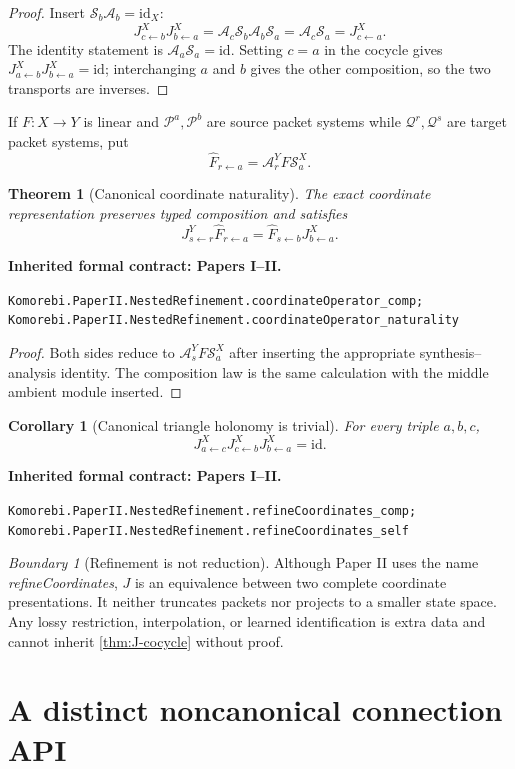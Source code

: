 \documentclass[11pt,a4paper]{article}
\newtheorem{theorem}{Theorem}[section]
\theoremstyle{plain}
\newtheorem{corollary}[corollary]{Corollary}
\theoremstyle{definition}
\theoremstyle{remark}
\newtheorem{boundary}[boundary]{Boundary}
\newcommand{\cA}{\mathcal A}
\newcommand{\cP}{\mathcal P}
\newcommand{\cQ}{\mathcal Q}
\newcommand{\cS}{\mathcal S}
\newcommand{\id}{\mathrm{id}}
\newcommand{\leanname}[1]{\nolinkurl{#1}}
\newcommand{\statusleanprior}[1]{\par\smallskip\noindent\begin{minipage}{\linewidth}{\color{leanblue}\textbf{Inherited formal contract: Papers I--II.}}\par\begingroup\small\raggedright\leanname{#1}\par\endgroup\end{minipage}\par\smallskip}
\begin{document}
\begin{proof}
Insert $\cS_b\cA_b=\id_X$:
\[
J^X_{c\leftarrow b}J^X_{b\leftarrow a}
=\cA_c\cS_b\cA_b\cS_a
=\cA_c\cS_a
=J^X_{c\leftarrow a}.
\]
The identity statement is $\cA_a\cS_a=\id$.  Setting $c=a$ in the cocycle
gives $J^X_{a\leftarrow b}J^X_{b\leftarrow a}=\id$; interchanging $a$ and $b$
gives the other composition, so the two transports are inverses.
\end{proof}

If $F:X\to Y$ is linear and $\cP^a,\cP^b$ are source packet systems while
$\cQ^r,\cQ^s$ are target packet systems, put
\[
\widehat F_{r\leftarrow a}
=
\cA^Y_rF\cS^X_a.
\]

\begin{theorem}[Canonical coordinate naturality]
\label{thm:canonical-naturality}
The exact coordinate representation preserves typed composition and satisfies
\[
J^Y_{s\leftarrow r}\widehat F_{r\leftarrow a}
=
\widehat F_{s\leftarrow b}J^X_{b\leftarrow a}.
\]
\end{theorem}
\statusleanprior{Komorebi.PaperII.NestedRefinement.coordinateOperator_comp; Komorebi.PaperII.NestedRefinement.coordinateOperator_naturality}

\begin{proof}
Both sides reduce to $\cA^Y_sF\cS^X_a$ after inserting the appropriate
synthesis--analysis identity.  The composition law is the same calculation
with the middle ambient module inserted.
\end{proof}

\begin{corollary}[Canonical triangle holonomy is trivial]
\label{cor:J-flat}
For every triple $a,b,c$,
\[
J^X_{a\leftarrow c}J^X_{c\leftarrow b}J^X_{b\leftarrow a}=\id.
\]
\end{corollary}
\statusleanprior{Komorebi.PaperII.NestedRefinement.refineCoordinates_comp; Komorebi.PaperII.NestedRefinement.refineCoordinates_self}

\begin{boundary}[Refinement is not reduction]
Although Paper II uses the name \emph{refineCoordinates}, $J$ is an
equivalence between two complete coordinate presentations.  It neither
truncates packets nor projects to a smaller state space.  Any lossy
restriction, interpolation, or learned identification is extra data and
cannot inherit \cref{thm:J-cocycle} without proof.
\end{boundary}

\section{A distinct noncanonical connection API}
\label{sec:connection}
\end{document}
